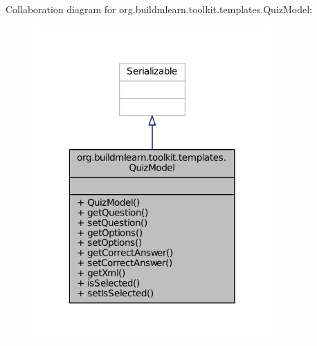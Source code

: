 Collaboration diagram for org.\-buildmlearn.\-toolkit.\-templates.\-Quiz\-Model\-:
\nopagebreak
\begin{figure}[H]
\begin{center}
\leavevmode
\includegraphics[width=258pt]{d1/d8b/classorg_1_1buildmlearn_1_1toolkit_1_1templates_1_1QuizModel__coll__graph}
\end{center}
\end{figure}
